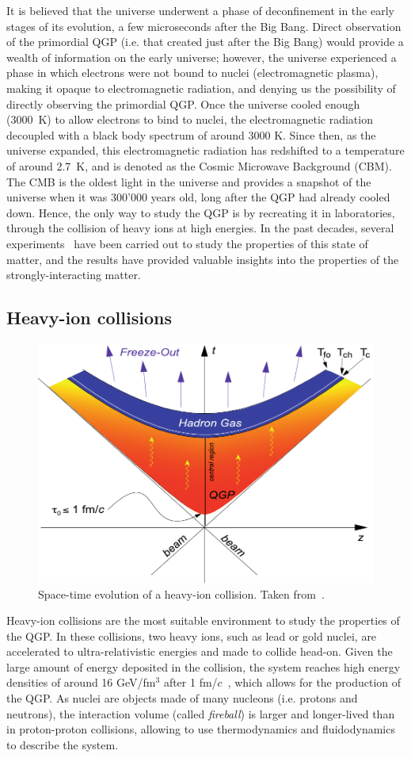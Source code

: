 It is believed that the universe underwent a phase of deconfinement in the early stages of its evolution, a few microseconds after the Big Bang. Direct observation of the primordial QGP (i.e. that created just after the Big Bang) would provide a wealth of information on the early universe; however, the universe experienced a phase in which electrons were not bound to nuclei (electromagnetic plasma), making it opaque to electromagnetic radiation, and denying us the possibility of directly observing the primordial QGP. Once the universe cooled enough (3000~K) to allow electrons to bind to nuclei, the electromagnetic radiation decoupled with a black body spectrum of around 3000 K. Since then, as the universe expanded, this electromagnetic radiation has redshifted to a temperature of around 2.7~K, and is denoted as the Cosmic Microwave Background (CBM). The CMB is the oldest light in the universe and provides a snapshot of the universe when it was 300'000 years old, long after the QGP had already cooled down. Hence, the only way to study the QGP is by recreating it in laboratories, through the collision of heavy ions at high energies. In the past decades, several experiments~\cite{ALICE:2022wpn, NA38:2000wlp, NA50:1997hlx, Nouicer:2009fy} have been carried out to study the properties of this state of matter, and the results have provided valuable insights into the properties of the strongly-interacting matter.

\subsection{Heavy-ion collisions}
\begin{figure}[t]
  \centering
  \includegraphics[width=0.7\linewidth]{Figures/Chapter 1/Bild_18.pdf}
  \caption{Space-time evolution of a heavy-ion collision. Taken from~\cite{Stock:2008ru}.}
  \label{fig:HeavyIonCollisions}
\end{figure}
Heavy-ion collisions are the most suitable environment to study the properties of the QGP. In these collisions, two heavy ions, such as lead or gold nuclei, are accelerated to ultra-relativistic energies and made to collide head-on. Given the large amount of energy deposited in the collision, the system reaches high energy densities of around 16 GeV/fm$^3$ after 1 fm/$c$~\cite{Loizides:2011ys}, which allows for the production of the QGP. As nuclei are objects made of many nucleons (i.e. protons and neutrons), the interaction volume (called \emph{fireball}) is larger and longer-lived than in proton-proton collisions, allowing to use thermodynamics and fluidodynamics to describe the system. 

